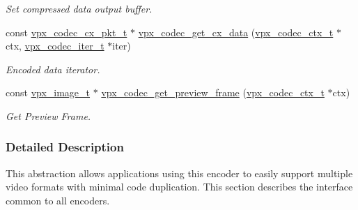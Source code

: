 \begin{DoxyCompactItemize}
\begin{DoxyCompactList}\small\item\em Set compressed data output buffer. \end{DoxyCompactList}\item 
const \hyperlink{group__encoder_ga3f711e17fbefac545e8959ef5a023556}{vpx\+\_\+codec\+\_\+cx\+\_\+pkt\+\_\+t} $\ast$ \hyperlink{group__encoder_gae81cab25d66cf3bc59f1f75f8a5af720}{vpx\+\_\+codec\+\_\+get\+\_\+cx\+\_\+data} (\hyperlink{group__codec_gad03e2dfa6ae511db7d25be6bbb336233}{vpx\+\_\+codec\+\_\+ctx\+\_\+t} $\ast$ctx, \hyperlink{group__codec_ga6ea348f76b1f8a1fe50e14db684146c6}{vpx\+\_\+codec\+\_\+iter\+\_\+t} $\ast$iter)
\begin{DoxyCompactList}\small\item\em Encoded data iterator. \end{DoxyCompactList}\item 
const \hyperlink{vpx__image_8h_abf5ac962cc6d71b4f0e39b1b0d033e55}{vpx\+\_\+image\+\_\+t} $\ast$ \hyperlink{group__encoder_ga250aee4536aa2475e85cf61c9710c963}{vpx\+\_\+codec\+\_\+get\+\_\+preview\+\_\+frame} (\hyperlink{group__codec_gad03e2dfa6ae511db7d25be6bbb336233}{vpx\+\_\+codec\+\_\+ctx\+\_\+t} $\ast$ctx)
\begin{DoxyCompactList}\small\item\em Get Preview Frame. \end{DoxyCompactList}\end{DoxyCompactItemize}


\subsubsection{Detailed Description}
This abstraction allows applications using this encoder to easily support multiple video formats with minimal code duplication. This section describes the interface common to all encoders. 

